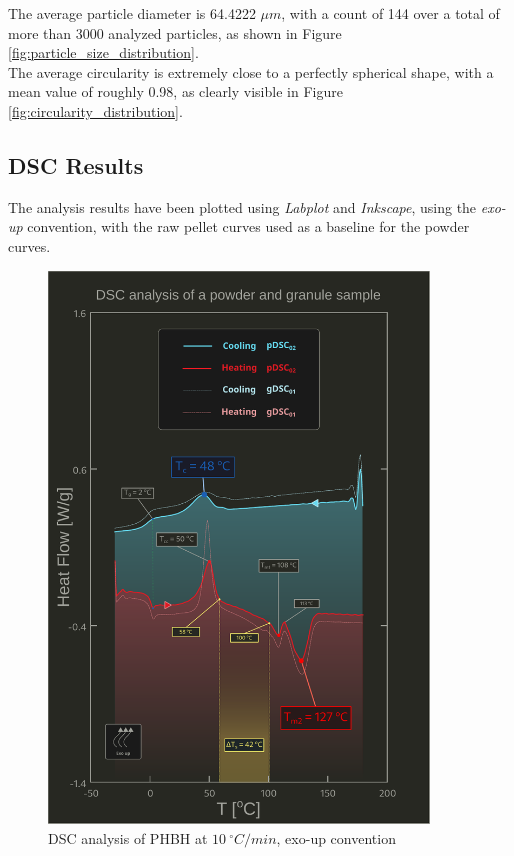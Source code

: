\documentclass[a4paper]{article}
\begin{document}
      The average particle diameter is 64.4222 $\mu m$, with a count of 144 over a total of more 
      than 3000 analyzed particles, as shown in Figure \ref{fig:particle_size_distribution}. \\ 
  
      The average circularity is extremely close to a perfectly spherical shape, with a 
      mean value of roughly 0.98, as clearly visible in Figure \ref{fig:circularity_distribution}. \\ 

      \clearpage

    \subsection{DSC Results\label{DSC_results}}

    The analysis results have been plotted using \textit{Labplot} 
    and \textit{Inkscape},
    using the \textit{exo-up} convention, with the raw pellet curves used as a baseline for the powder curves. \\
        \begin{figure}[H]
            \centering 
            \includegraphics[width=0.9\textwidth]{Pictures/Thermal_analysis_plots/DSC_alberto.pdf}
            \caption{DSC analysis of PHBH at $10 \ ^{\circ}C/min$, exo-up convention}
            \label{fig:DSC_10Cmin}
        \end{figure}
\end{document}
